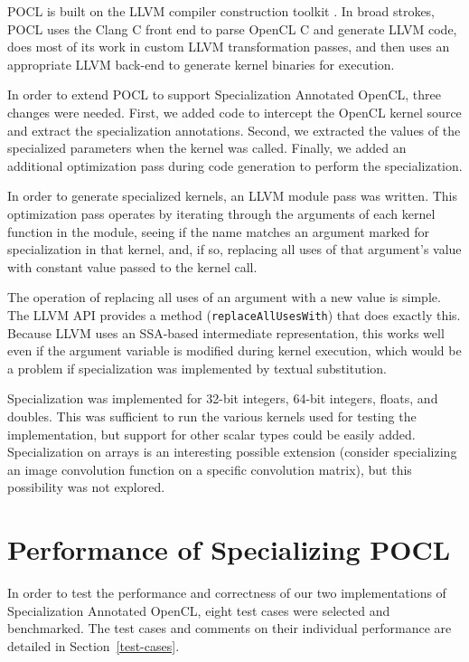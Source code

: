 \documentclass{acm_proc_article-sp}
\begin{document}
POCL is built on the LLVM compiler construction toolkit
\cite{Lattner:2002:LLVM}. In broad strokes, POCL uses the Clang C front end to
parse OpenCL C and generate LLVM code, does most of its work in custom LLVM
transformation passes, and then uses an appropriate LLVM back-end to generate
kernel binaries for execution.

In order to extend POCL to support Specialization Annotated OpenCL, three
changes were needed. First, we added code to intercept the OpenCL kernel source
and  extract the specialization annotations. Second, we extracted the values of
the specialized parameters when the kernel was called. Finally, we added an
additional optimization pass during code generation to perform the
specialization.

In order to generate specialized kernels, an LLVM module pass was written.
This optimization pass operates by iterating through the arguments of each
kernel function in the module, seeing if the name matches an argument marked
for specialization in that kernel, and, if so, replacing all uses of that
argument's value with constant value passed to the kernel call. 

The operation of replacing all uses of an argument with a new value is simple.
The LLVM API provides a method ({\tt replaceAllUsesWith}) that does exactly
this. Because LLVM uses an SSA-based intermediate representation, this works
well even if the argument variable is modified during kernel execution, which
would be a problem if specialization was implemented by textual substitution.

Specialization was implemented for 32-bit integers, 64-bit integers, floats,
and doubles. This was sufficient to run the various kernels used for testing the
implementation, but support for other scalar types could be easily added.
Specialization on arrays is an interesting possible extension (consider
specializing an image convolution function on a specific convolution matrix),
but this possibility was not explored.

\section{Performance of Specializing POCL}

In order to test the performance and correctness of our two implementations of
Specialization Annotated OpenCL, eight test cases were selected and benchmarked.
The test cases and comments on their individual performance are detailed in
Section~\ref{test-cases}. 
\end{document}
